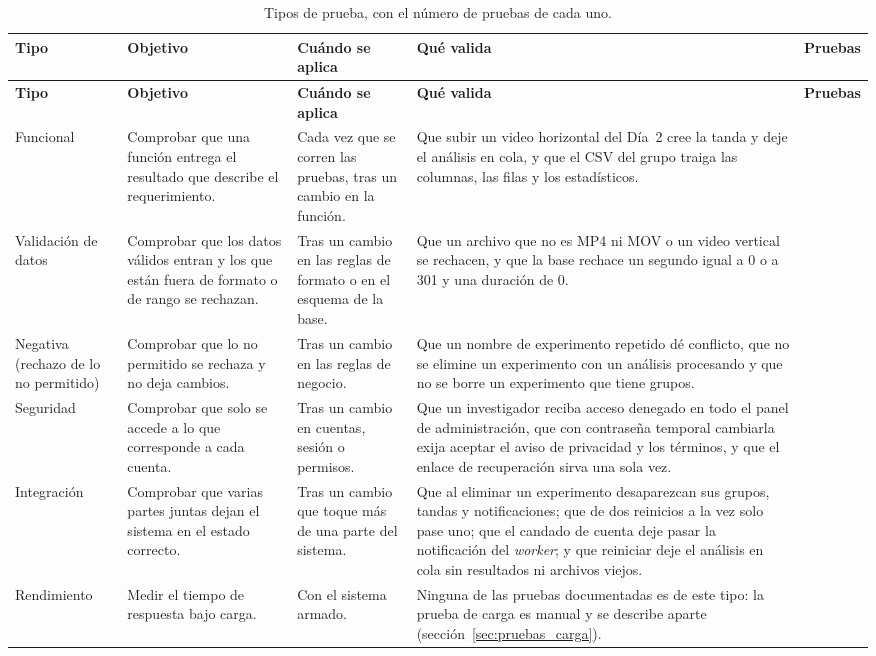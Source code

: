 {\footnotesize\singlespacing
\begin{longtable}{|>{\raggedright}p{1.8cm}|>{\raggedright}p{2.8cm}|>{\raggedright}p{2.6cm}|>{\raggedright}p{4.5cm}|>{\raggedright\arraybackslash}p{1.2cm}|}
\caption{Tipos de prueba, con el número de pruebas de cada uno.
\label{tab:pruebas_tipos}}\\
\hline
\textbf{Tipo} & \textbf{Objetivo} & \textbf{Cuándo se aplica} & \textbf{Qué valida} & \textbf{Pruebas} \\
\hline
\endfirsthead
\hline
\textbf{Tipo} & \textbf{Objetivo} & \textbf{Cuándo se aplica} & \textbf{Qué valida} & \textbf{Pruebas} \\
\hline
\endhead
Funcional
& Comprobar que una función entrega el resultado que describe el requerimiento.
& Cada vez que se corren las pruebas, tras un cambio en la función.
& Que subir un video horizontal del Día~2 cree la tanda y deje el análisis en cola, y que el CSV del grupo traiga las columnas, las filas y los estadísticos.
& 20 \\
\hline
Validación de datos
& Comprobar que los datos válidos entran y los que están fuera de formato o de rango se rechazan.
& Tras un cambio en las reglas de formato o en el esquema de la base.
& Que un archivo que no es MP4 ni MOV o un video vertical se rechacen, y que la base rechace un segundo igual a 0 o a 301 y una duración de 0.
& 21 \\
\hline
Negativa (rechazo de lo no permitido)
& Comprobar que lo no permitido se rechaza y no deja cambios.
& Tras un cambio en las reglas de negocio.
& Que un nombre de experimento repetido dé conflicto, que no se elimine un experimento con un análisis procesando y que no se borre un experimento que tiene grupos.
& 20 \\
\hline
Seguridad
& Comprobar que solo se accede a lo que corresponde a cada cuenta.
& Tras un cambio en cuentas, sesión o permisos.
& Que un investigador reciba acceso denegado en todo el panel de administración, que con contraseña temporal cambiarla exija aceptar el aviso de privacidad y los términos, y que el enlace de recuperación sirva una sola vez.
& 12 \\
\hline
Integración
& Comprobar que varias partes juntas dejan el sistema en el estado correcto.
& Tras un cambio que toque más de una parte del sistema.
& Que al eliminar un experimento desaparezcan sus grupos, tandas y notificaciones; que de dos reinicios a la vez solo pase uno; que el candado de cuenta deje pasar la notificación del \textit{worker}; y que reiniciar deje el análisis en cola sin resultados ni archivos viejos.
& 4 \\
\hline
Rendimiento
& Medir el tiempo de respuesta bajo carga.
& Con el sistema armado.
& Ninguna de las pruebas documentadas es de este tipo: la prueba de carga es manual y se describe aparte (sección~\ref{sec:pruebas_carga}).
& 0 \\
\hline
\end{longtable}
}

